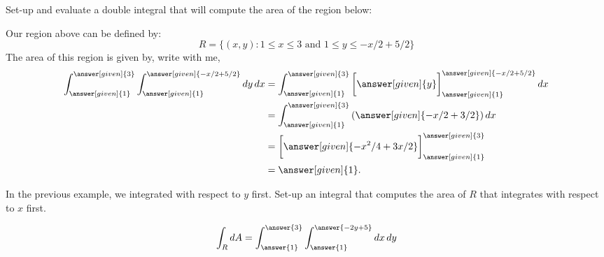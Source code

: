\documentclass{ximera}
\begin{document}
\begin{example}
  Set-up and evaluate a double integral that will compute the area of
  the region below:
  \begin{image}
  \end{image}
  \begin{explanation}
    Our region above can be defined by:
    \[
    R=\{(x,y):\text{$1\leq x\leq 3$ and $1\leq y\leq -x/2+5/2$}\}
    \]
    The area of this region is given by, write with me, 
    \begin{align*}
      \int_{\answer[given]{1}}^{\answer[given]{3}}\int_{\answer[given]{1}}^{\answer[given]{-x/2+5/2}}\d y \d x &= \int_{\answer[given]{1}}^{\answer[given]{3}} \eval{\answer[given]{y}}_{\answer[given]{1}}^{\answer[given]{-x/2+5/2}} \d x\\
      &=  \int_{\answer[given]{1}}^{\answer[given]{3}} \left(\answer[given]{-x/2+3/2}\right) \d x\\
      &=  \eval{\answer[given]{-x^2/4+3x/2}}_{\answer[given]{1}}^{\answer[given]{3}}\\
      &= \answer[given]{1}. 
    \end{align*}
  \end{explanation}
\end{example}

\begin{question}
  In the previous example, we integrated with respect to $y$
  first. Set-up an integral that computes the area of $R$ that
  integrates with respect to $x$ first.
  \begin{prompt}
    \[
    \int_R \d A = \int_{\answer{1}}^{\answer{3}}\int_{\answer{1}}^{\answer{-2y+5}} \d x \d y
    \]
  \end{prompt}
\end{question}
\end{document}
